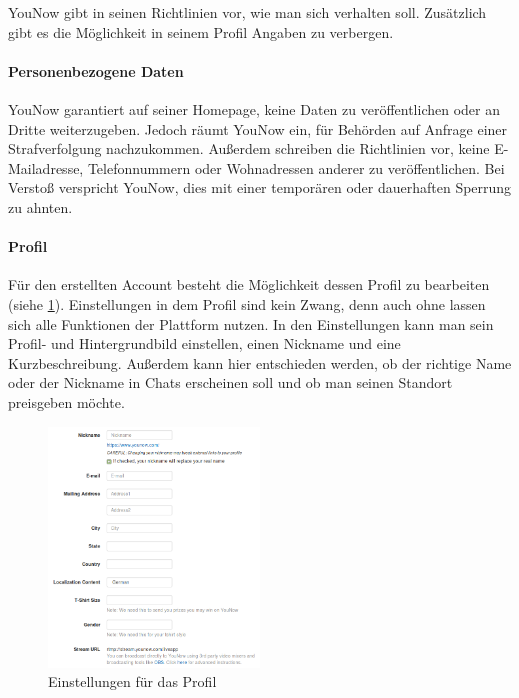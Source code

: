 YouNow gibt in seinen Richtlinien vor, wie man sich verhalten soll. Zusätzlich gibt es die Möglichkeit in seinem Profil Angaben zu verbergen.

\paragraph{Personenbezogene Daten}
YouNow garantiert auf seiner Homepage, keine Daten zu veröffentlichen oder an Dritte weiterzugeben. Jedoch räumt YouNow ein, für Behörden auf Anfrage einer Strafverfolgung nachzukommen. Außerdem schreiben die Richtlinien vor, keine E-Mailadresse, Telefonnummern oder Wohnadressen anderer zu veröffentlichen. Bei Verstoß verspricht YouNow, dies mit einer temporären oder dauerhaften Sperrung zu ahnten.  

\paragraph{Profil}
Für den erstellten Account besteht die Möglichkeit dessen Profil zu bearbeiten (siehe \ref{profil_einstellungen}). Einstellungen in dem Profil sind kein Zwang, denn auch ohne lassen sich alle Funktionen der Plattform nutzen. In den Einstellungen kann man sein Profil- und Hintergrundbild einstellen, einen Nickname und eine Kurzbeschreibung. Außerdem kann hier entschieden werden, ob der richtige Name oder der Nickname in Chats erscheinen soll und ob man seinen Standort preisgeben möchte.

\begin{figure}[h!]
\centering
\includegraphics[width=0.5\textwidth]{./resources/younow_profile_settings}
\caption{Einstellungen für das Profil}
\label{profil_einstellungen}
\end{figure} 
